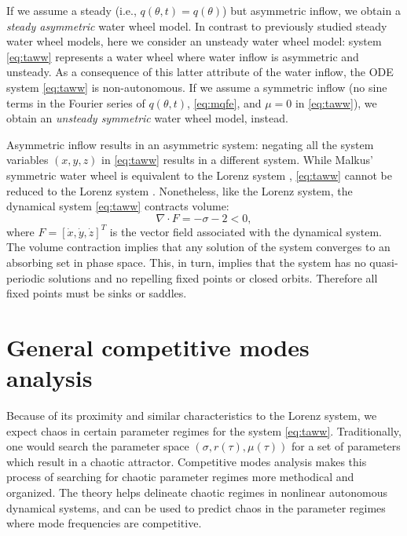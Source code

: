 If we assume a steady (i.e., $q(\theta,t) = q(\theta)$) but asymmetric inflow, we obtain a \emph{steady asymmetric} water wheel model. In contrast to previously studied steady water wheel models, here we consider an unsteady water wheel model: system \eqref{eq:taww} represents a water wheel where water inflow is asymmetric and unsteady. As a consequence of this latter attribute of the water inflow, the ODE system \eqref{eq:taww} is non-autonomous. If we assume a symmetric inflow (no sine terms in the Fourier series of $q(\theta,t)$, \eqref{eq:mqfe}, and $\mu =0$ in \eqref{eq:taww}), we obtain an \emph{unsteady symmetric} water wheel model, instead.

Asymmetric inflow results in an asymmetric system: negating all the system 
variables $(x,y,z)$ in \eqref{eq:taww} results in a different system. While 
Malkus' symmetric water wheel is equivalent to the Lorenz system 
\cite{Strogatz14,Lorenz63}, \eqref{eq:taww} cannot be reduced to the Lorenz 
system \cite{MS06}. Nonetheless, like the Lorenz system, the dynamical system 
\eqref{eq:taww} contracts volume:
$$\nabla \cdot F = -\sigma -2 <0,$$
where $F = [\dot x, \dot y, \dot z]^T$ is the vector field associated with the 
dynamical system. The volume contraction implies that any solution of the system converges to an absorbing set in phase space. This, in turn, implies that the system has no quasi-periodic solutions 
and no repelling fixed points or closed orbits. Therefore all fixed points must 
be sinks or saddles.

\section{General competitive modes analysis} \label{sec:cm}
Because of its proximity and similar characteristics to the Lorenz system, we expect chaos in certain parameter regimes for the system \eqref{eq:taww}. Traditionally, one would search the parameter space $(\sigma, r(\tau), \mu(\tau))$ for a set of parameters which result in a chaotic attractor. Competitive modes analysis makes this process of searching for chaotic parameter regimes more methodical and organized. The theory helps delineate chaotic regimes in nonlinear autonomous dynamical systems, and can be used to predict chaos in the parameter regimes where mode frequencies are competitive.

